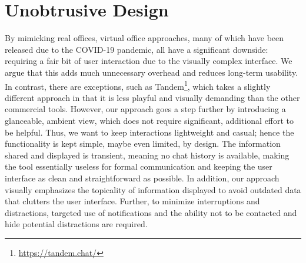 \section{Unobtrusive Design}
By mimicking real offices, virtual office approaches, many of which have been released due to the COVID-19 pandemic, all have a significant downside: requiring a fair bit of user interaction due to the visually complex interface. We argue that this adds much unnecessary overhead and reduces long-term usability. In contrast, there are exceptions, such as Tandem\footnote{\url{https://tandem.chat/}}, which takes a slightly different approach in that it is less playful and visually demanding than the other commercial tools. However, our approach goes a step further by introducing a glanceable, ambient view, which does not require significant, additional effort to be helpful. 
Thus, we want to keep interactions lightweight and casual; hence the functionality is kept simple, maybe even limited, by design. The information shared and displayed is transient, meaning no chat history is available, making the tool essentially useless for formal communication and keeping the user interface as clean and straightforward as possible. In addition, our approach visually emphasizes the topicality of information displayed to avoid outdated data that clutters the user interface. Further, to minimize interruptions and distractions, targeted use of notifications and the ability not to be contacted and hide potential distractions are required.
